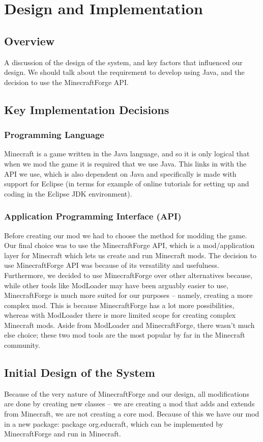 \chapter{Design and Implementation}

\section{Overview}
A discussion of the design of the system, and key factors that 
influenced our design. We should talk about the requirement to 
develop using Java, and the decision to use the MinecraftForge API.

\section{Key Implementation Decisions}

\subsection{Programming Language}
Minecraft is a game written in the Java language, and so it is 
only logical that when we mod the game it is required that we use 
Java. This links in with the API we use, which is also dependent 
on Java and specifically is made with support for Eclipse (in 
terms for example of online tutorials for setting up and coding 
in the Eclipse JDK environment). 

\subsection{Application Programming Interface (API)}
Before creating our mod we had to choose the method for modding 
the game. Our final choice was to use the MinecraftForge API, which 
is a mod/application layer for Minecraft which lets us create and 
run Minecraft mods. The decision to use MinecraftForge API was 
because of its versatility and usefulness. Furthermore, we decided 
to use MinecraftForge over other alternatives because, while other 
tools like ModLoader may have been arguably easier to use, MinecraftForge 
is much more suited for our purposes – namely, creating a more complex 
mod. This is because MinecraftForge has a lot more possibilities, whereas 
with ModLoader there is more limited scope for creating complex Minecraft 
mods. Aside from ModLoader and MinecraftForge, there wasn’t much else 
choice; these two mod tools are the most popular by far in the Minecraft 
community.  

\section{Initial Design of the System}
Because of the very nature of MinecraftForge and our design, 
all modifications are done by creating new classes – we are 
creating a mod that adds and extends from Minecraft, we are 
not creating a core mod. Because of this we have our mod in 
a new package: package org.educraft, which can be implemented 
by MinecraftForge and run in Minecraft. 

